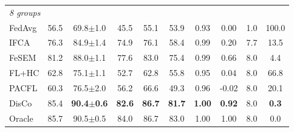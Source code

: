 \begin{tabular}{lccccccccc}
\midrule
\multicolumn{10}{l}{\textit{8 groups}}\\
FedAvg & 56.5 & 69.8$\pm$1.0 & 45.5 & 55.1 & 53.9 & 0.93 & 0.00 & 1.0 & 100.0 \\
IFCA & 76.3 & 84.9$\pm$1.4 & 74.9 & 76.1 & 58.4 & 0.99 & 0.20 & 7.7 & 13.5 \\
FeSEM & 81.2 & 88.0$\pm$1.1 & 77.6 & 83.0 & 75.4 & 0.99 & 0.66 & 8.0 & 4.4 \\
FL+HC & 62.8 & 75.1$\pm$1.1 & 52.7 & 62.8 & 55.8 & 0.95 & 0.04 & 8.0 & 66.8 \\
PACFL & 60.3 & 76.5$\pm$2.0 & 56.2 & 66.6 & 49.3 & 0.96 & -0.02 & 8.0 & 20.1 \\
DisCo & 85.4 & \textbf{90.4$\pm$0.6} & \textbf{82.6} & \textbf{86.7} & \textbf{81.7} & \textbf{1.00} & \textbf{0.92} & 8.0 & \textbf{0.3} \\
Oracle & 85.7 & 90.5$\pm$0.5 & 84.0 & 86.7 & 83.0 & 1.00 & 1.00 & 8.0 & 0.0 \\
\bottomrule
\end{tabular}

